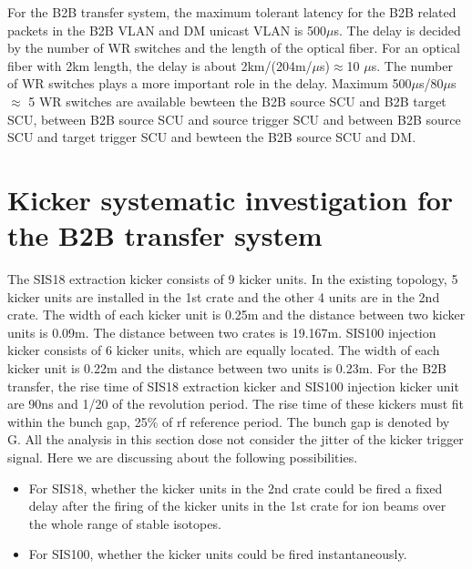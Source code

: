 For the B2B transfer system, the maximum tolerant latency for the B2B related packets in the B2B VLAN and DM unicast VLAN is 500$\mu$s. The delay is decided by the number of WR switches and the length of the optical fiber. For an optical fiber with 2km length, the delay is about 2km/(204m/$\mu$s)$\approx$10 $\mu$s. The number of WR switches plays a more important role in the delay. Maximum 500$\mu$s/80$\mu$s $\approx$ 5 WR switches are available bewteen the B2B source SCU and B2B target SCU, between B2B source SCU and source trigger SCU and between B2B source SCU and target trigger SCU and bewteen the B2B source SCU and DM. 
\section{Kicker systematic investigation for the B2B transfer system}
The SIS18 extraction kicker consists of 9 kicker units. In the existing topology, 5 kicker units are installed in the 1st crate and the other 4 units are in the 2nd crate. The width of each kicker unit is 0.25m and the distance between two kicker units is 0.09m. The distance between two crates is 19.167m. SIS100 injection kicker consists of 6 kicker units, which are equally located. The width of each kicker unit is 0.22m and the distance between two units is 0.23m. For the B2B transfer, the rise time of SIS18 extraction kicker and SIS100 injection kicker unit are 90ns and 1/20 of the revolution period. The rise time of these kickers must fit within the bunch gap, 25$\%$ of rf reference period. The bunch gap is denoted by G. All the analysis in this section dose not consider the jitter of the kicker trigger signal. Here we are discussing about the following possibilities. 
\begin{itemize}
    \item For SIS18, whether the kicker units in the 2nd crate could be fired a fixed delay after the firing of the kicker units in the 1st crate for ion beams over the whole range of stable isotopes. 
    \item For SIS100, whether the kicker units could be fired instantaneously. 
\end{itemize} 

